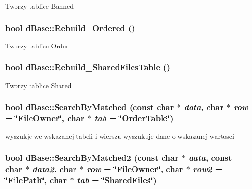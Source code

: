 Tworzy tablice Banned 

\hypertarget{classdBase_a7a5431d74f4b1f7b201c25b7d3a52ffa}{
\subsubsection[{Rebuild\_\-Ordered}]{\setlength{\rightskip}{0pt plus 5cm}bool dBase::Rebuild\_\-Ordered ()}}
\label{classdBase_a7a5431d74f4b1f7b201c25b7d3a52ffa}


Tworzy tablice Order 

\hypertarget{classdBase_a9e9715965ba80d3c7a9c401d62a43f6a}{
\subsubsection[{Rebuild\_\-SharedFilesTable}]{\setlength{\rightskip}{0pt plus 5cm}bool dBase::Rebuild\_\-SharedFilesTable ()}}
\label{classdBase_a9e9715965ba80d3c7a9c401d62a43f6a}


Tworzy tablice Shared 

\hypertarget{classdBase_a91269d6744d42078ac8880d32e3a1229}{
\subsubsection[{SearchByMatched}]{\setlength{\rightskip}{0pt plus 5cm}bool dBase::SearchByMatched (const char $\ast$ {\em data}, \/  char $\ast$ {\em row} = {\ttfamily \char`\"{}FileOwner\char`\"{}}, \/  char $\ast$ {\em tab} = {\ttfamily \char`\"{}OrderTable\char`\"{}})}}
\label{classdBase_a91269d6744d42078ac8880d32e3a1229}


wyszukje we wskazanej tabeli i wierszu wyszukuje dane o wskazanej wartosci 

\hypertarget{classdBase_aa6aba86beb506496929ea8ff8aef8245}{
\subsubsection[{SearchByMatched2}]{\setlength{\rightskip}{0pt plus 5cm}bool dBase::SearchByMatched2 (const char $\ast$ {\em data}, \/  const char $\ast$ {\em data2}, \/  char $\ast$ {\em row} = {\ttfamily \char`\"{}FileOwner\char`\"{}}, \/  char $\ast$ {\em row2} = {\ttfamily \char`\"{}FilePath\char`\"{}}, \/  char $\ast$ {\em tab} = {\ttfamily \char`\"{}SharedFiles\char`\"{}})}}
\label{classdBase_aa6aba86beb506496929ea8ff8aef8245}


